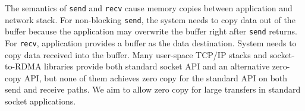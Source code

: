 The semantics of \texttt{send} and \texttt{recv} cause memory copies between application and network stack. For non-blocking \texttt{send}, the system needs to copy data out of the buffer because the application may overwrite the buffer right after \texttt{send} returns. %
For \texttt{recv}, application provides a buffer as the data destination. %
System needs to copy data received into the buffer. 
Many user-space TCP/IP stacks and socket-to-RDMA libraries provide both standard socket API and an alternative zero-copy API, but none of them achieves zero copy for the standard API on both send and receive paths.%
We aim to allow zero copy for large transfers in standard socket applications.








